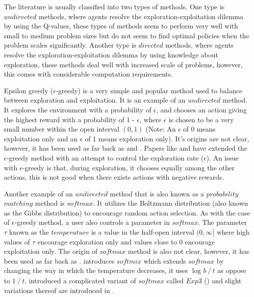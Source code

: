 \documentclass[11pt]{report}
\begin{document}
The literature is usually classified into two types of methods. One type is $undirected$ methods, where agents resolve 
the exploration-exploitation dilemma by using the Q-values, these types of methods seem to perform very well with small 
to medium problem sizes but do not seem to find optimal policies when the problem scales significantly. Another type is 
$directed$ methods, where agents resolve the exploration-exploitation dilemma by using knowledge about exploration, 
these methods deal well with increased scale of problems, however, this comes with considerable computation requirements.

Epsilon greedy ($\epsilon$-greedy) is a very simple and popular method used to balance between exploration and 
exploitation. It is an example of an $undirected$ method. It explores the environment with a probability of $\epsilon$,
and chooses an action giving the highest reward with a probability of 1 - $\epsilon$, where $\epsilon$ is chosen to be a 
very small number within the open interval $(0, 1)$ (Note: An $\epsilon$ of 0 means exploitation only and an $\epsilon$ 
of 1 means exploration only). It's origins are not clear, however, it has been used as far back as 
\citet*{watkins1989learning} and \citet*{sutton1998introduction}. Papers like \citet*{tokic2011value} and 
\citet*{dos2017adaptive} have extended the $\epsilon$-greedy method with an attempt to control the exploration rate 
($\epsilon$). An issue with $\epsilon$-greedy is that, during exploration, it chooses equally among the other actions, 
this is not good when there exists actions with negative rewards.

Another example of an $undirected$ method that is also known as a $probability$ $matching$ method is $softmax$. It 
utilizes the Boltzmann distribution (also known as the Gibbs distribution) to encourage random action selection. As with 
the case of $\epsilon$-greedy method, a user also controls a parameter in $softmax$. The parameter $\tau$ known as the 
$temperature$ is a value in the half-open interval $(0, \infty]$ where high values of $\tau$ encourage exploration only 
and values close to 0 encourage exploitation only. The origin of $softmax$ method is also not clear, however, it has 
been used as far back as \citet*{luce1959d}. \citet*{cesa1998finite} introduces $softmix$ which extends $softmax$ 
by changing the way in which the temperature decreases, it uses $\log_{}b \mathbin{/} t$ as oppose to $1 \mathbin{/} t$.
\citet*{auer1995gambling} introduced a complicated variant of $softmax$ called $Exp3$ () and slight variations thereof are introduced in 
\citet*{auer2002nonstochastic}.
\end{document}
